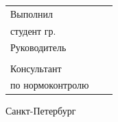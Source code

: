 \vspace{4mm plus2fill}%

\noindent
\begin{tabularx}{\linewidth}{lXl}
	Выполнил              &	   &             \\
	студент гр.~\group     &    & \Author     \\[\mfloatsep]

	Руководитель 		  &    &             \\
	\SupervisorJob 		  &    & \Supervisor \\[\mfloatsep]

	Консультант  &    &  \\
	по нормоконтролю  		 	  &    & \ConsultantNorm
\end{tabularx} %


%
\vspace{0pt plus4fill}%


\begin{center}%
Санкт-Петербург \\
\thesisYear
\end{center}%
\restoregeometry
\newpage